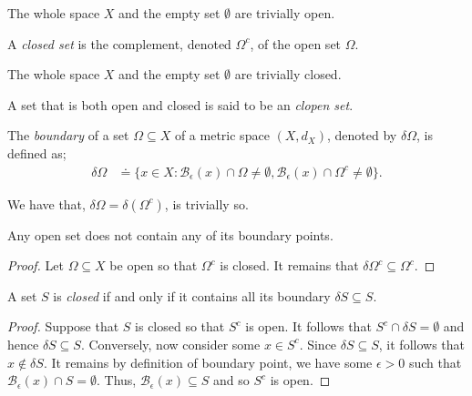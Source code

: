 \begin{lem}
  The whole space $X$ and the empty set $\emptyset$ are trivially open.
\end{lem}

\begin{defn}
  A \emph{closed set} is the complement, denoted $\Omega^c$, of
  the open set $\Omega$.
\end{defn}

\begin{lem}
  The whole space $X$ and the empty set $\emptyset$ are trivially closed.
\end{lem}

\begin{defn}
  A set that is both open and closed is said to be an \emph{clopen set}.
\end{defn}

\begin{defn}[Boundary]
  The \emph{boundary} of a set $\Omega \subseteq X$ of a metric space $(X,d_X)$,
  denoted by $\delta \Omega$, is defined as;
  \begin{align*}
    \delta \Omega & \doteq \{
  x \in X : \mathcal{B}_{\epsilon}(x) \cap \Omega \neq \emptyset ,
  \mathcal{B}_{\epsilon}(x) \cap \Omega^c \neq \emptyset \}.
  \end{align*}
\end{defn}

\begin{lem}
  We have that, $\delta \Omega = \delta (\Omega^c)$, is trivially so.
\end{lem}

\begin{prop}
  Any open set does not contain any of its boundary points.
\end{prop}

\begin{proof}
  Let $\Omega \subseteq X$ be open so that $\Omega^c$ is closed. It remains that
  $\delta \Omega^c \subseteq \Omega^c$. \qedhere
\end{proof}

\begin{prop}
  A set $S$ is \emph{closed} if and only if it contains
  all its boundary $\delta S \subseteq S$.
\end{prop}

\begin{proof}
  Suppose that $S$ is closed so that $S^c$ is open.
  It follows that $S^c \cap \delta S = \emptyset$ and hence $\delta S \subseteq S$.
  Conversely, now consider some $x \in S^c$. Since $\delta S \subseteq S$,
  it follows that $x \notin \delta S$. It remains by definition of
  boundary point, we have some $\epsilon>0$ such that
  $\mathcal{B}_{\epsilon}(x) \cap S = \emptyset$.
  Thus, $\mathcal{B}_{\epsilon}(x) \subseteq S$ and so $S^c$ is open. \qedhere
\end{proof}

